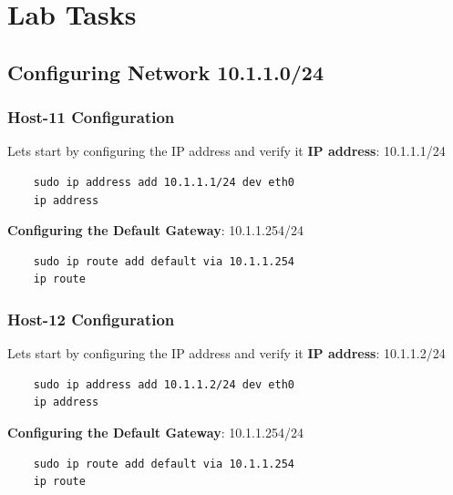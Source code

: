 \section{Lab Tasks}
\subsection{Configuring Network 10.1.1.0/24}

\subsubsection{Host-11 Configuration}
Lets start by configuring the IP address and verify it
\textbf{IP address}: 10.1.1.1/24

\begin{verbatim}
    sudo ip address add 10.1.1.1/24 dev eth0
    ip address
\end{verbatim}

\textbf{Configuring the Default Gateway}: 10.1.1.254/24
\begin{verbatim}
    sudo ip route add default via 10.1.1.254
    ip route
\end{verbatim}

\subsubsection{Host-12 Configuration}
Lets start by configuring the IP address and verify it
\newline
\newline
\textbf{IP address}: 10.1.1.2/24

\begin{verbatim}
    sudo ip address add 10.1.1.2/24 dev eth0
    ip address
\end{verbatim}

\textbf{Configuring the Default Gateway}: 10.1.1.254/24

\begin{verbatim}
    sudo ip route add default via 10.1.1.254
    ip route
\end{verbatim}

